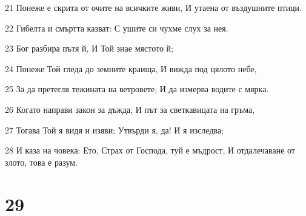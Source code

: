 \par 21 Понеже е скрита от очите на всичките живи, И утаена от въздушните птици.
\par 22 Гибелта и смъртта казват: С ушите си чухме слух за нея.
\par 23 Бог разбира пътя й, И Той знае мястото й;
\par 24 Понеже Той гледа до земните краища, И вижда под цялото небе,
\par 25 За да претегля тежината на ветровете, И да измерва водите с мярка.
\par 26 Когато направи закон за дъжда, И път за светкавицата на гръма,
\par 27 Тогава Той я видя и изяви; Утвърди я, да! И я изследва;
\par 28 И каза на човека: Ето, Страх от Господа, туй е мъдрост, И отдалечаване от злото, това е разум.

\chapter{29}

